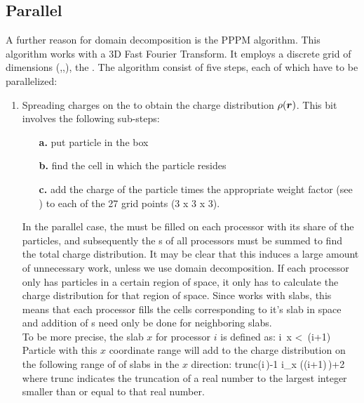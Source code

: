 {\subsection{Parallel }
A further reason for domain decomposition is the PPPM algorithm. This
algorithm works with a 3D Fast Fourier Transform. It employs a
discrete grid of dimensions (\nx,\ny,\nz), the {\fftgrid}. The
algorithm consist of five steps, each of which have to be
parallelized:
\begin{enumerate}
\item   Spreading charges on the {\fftgrid} to obtain the charge 
        distribution $\rho(\mbox{\boldmath ${r}$})$.
        This bit involves the following sub-steps:
        \begin{enumerate}
        \item[{\bf a.}] put particle in the box
        \item[{\bf b.}] find the {\fftgrid} cell in which the particle resides
        \item[{\bf c.}] add the charge of the particle times the appropriate
                        weight factor (see ) to 
                        each of the 27 grid points (3 x 3 x 3).
        \end{enumerate}
        In the parallel case, the {\fftgrid} 
        must be filled on each processor with its
        share of the particles, and subsequently the {\fftgrid}s of all processors
        must be summed to find the total charge distribution. It may be clear that
        this induces a large amount of unnecessary work, unless we use domain
        decomposition. If each processor only has particles in a certain region
        of space, it only has to calculate the charge distribution for 
        that region of space. Since {\gromacs} works with slabs, this means that
        each processor fills the {\fftgrid} cells corresponding to it's slab in space
        and addition of {\fftgrid}s need only be done for neighboring slabs.\\
        To be more precise, the slab $x$ for processor $i$ is defined as:
        \beq
        i\,  \le x <\, (i+1)
        \eeq
        Particle with this $x$ coordinate range will add to the charge distribution
        on the following range of 
        of {\fftgrid} slabs in the $x$ direction:
        \beq
        {\rm trunc}\left(i\,\right)-1 \le i_x \left((i+1)\,\right)+2
        \eeq
        where trunc indicates the truncation of a real number to the largest integer
        smaller than or equal to that real number.
        

\end{enumerate}}
